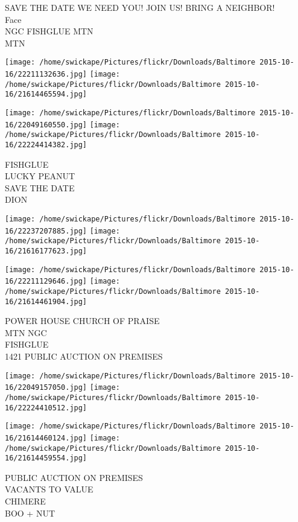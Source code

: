 \documentclass[10pt,letterpaper]{article}
\begin{document}
SAVE THE DATE WE NEED YOU!  JOIN US!  BRING A NEIGHBOR!\\
Face\\
NGC FISHGLUE MTN\\
MTN\\
\pagebreak

\texttt{[image: /home/swickape/Pictures/flickr/Downloads/Baltimore 2015-10-16/22211132636.jpg]}
\texttt{[image: /home/swickape/Pictures/flickr/Downloads/Baltimore 2015-10-16/21614465594.jpg]}

\texttt{[image: /home/swickape/Pictures/flickr/Downloads/Baltimore 2015-10-16/22049160550.jpg]}
\texttt{[image: /home/swickape/Pictures/flickr/Downloads/Baltimore 2015-10-16/22224414382.jpg]}

FISHGLUE\\
LUCKY PEANUT\\
SAVE THE DATE\\
DION\\
\pagebreak

\texttt{[image: /home/swickape/Pictures/flickr/Downloads/Baltimore 2015-10-16/22237207885.jpg]}
\texttt{[image: /home/swickape/Pictures/flickr/Downloads/Baltimore 2015-10-16/21616177623.jpg]}

\texttt{[image: /home/swickape/Pictures/flickr/Downloads/Baltimore 2015-10-16/22211129646.jpg]}
\texttt{[image: /home/swickape/Pictures/flickr/Downloads/Baltimore 2015-10-16/21614461904.jpg]}

POWER HOUSE CHURCH OF PRAISE\\
MTN NGC\\
FISHGLUE\\
1421 PUBLIC AUCTION ON PREMISES\\
\pagebreak

\texttt{[image: /home/swickape/Pictures/flickr/Downloads/Baltimore 2015-10-16/22049157050.jpg]}
\texttt{[image: /home/swickape/Pictures/flickr/Downloads/Baltimore 2015-10-16/22224410512.jpg]}

\texttt{[image: /home/swickape/Pictures/flickr/Downloads/Baltimore 2015-10-16/21614460124.jpg]}
\texttt{[image: /home/swickape/Pictures/flickr/Downloads/Baltimore 2015-10-16/21614459554.jpg]}

PUBLIC AUCTION ON PREMISES\\
VACANTS TO VALUE\\
CHIMERE\\
BOO + NUT\\
\pagebreak
\end{document}
